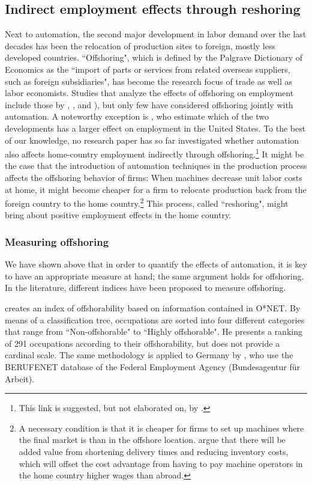 \documentclass[11pt,a4paper,fleqn]{article}
\begin{document}
\subsection{Indirect employment effects through reshoring}
Next to automation, the second major development in labor demand over the last decades has been the relocation of production sites to foreign, mostly less developed countries. ``Offshoring", which is defined by the Palgrave Dictionary of Economics as the ``import of parts or services from related overseas suppliers, such as foreign subsidiaries", has become the research focus of trade as well as labor economists. Studies that analyze the effects of offshoring on employment include those by \cite{FH1999}, \cite{GR2008}, \cite{EHMP2014} and \cite{HJMX2014}), but only few have considered offshoring jointly with automation. A noteworthy exception is \cite{GMS2014}, who estimate which of the two developments has a larger effect on employment in the United States. To the best of our knowledge, no research paper has so far investigated whether automation also affects home-country employment indirectly through offshoring.\footnote{This link is suggested, but not elaborated on, by \cite{BM2014}.} It might be the case that the introduction of automation techniques in the production process affects the offshoring behavior of firms: When machines decrease unit labor costs at home, it might become cheaper for a firm to relocate production back from the foreign country to the home country.\footnote{A necessary condition is that it is cheaper for firms to set up machines where the final market is than in the offshore location. \cite{BMS2014} argue that there will be added value from shortening delivery times and reducing inventory costs, which will offset the cost advantage from having to pay machine operators in the home country higher wages than abroad.}
This process, called ``reshoring", might bring about positive employment effects in the home country.

\subsubsection*{Measuring offshoring}
We have shown above that in order to quantify the effects of automation, it is key to have an appropriate measure at hand; the same argument holds for offshoring. In the literature, different indices have been proposed to measure offshoring.

\cite{B2009} creates an index of offshorability based on information contained in O*NET. By means of a classification tree, occupations are sorted into four different categories that range from ``Non-offshorable" to ``Highly offshorable". He presents a ranking of 291 occupations according to their offshorability, but does not provide a cardinal scale. The same methodology is applied to Germany by \cite{SL2009}, who use the BERUFENET database of the Federal Employment Agency (Bundesagentur für Arbeit).
\end{document}
